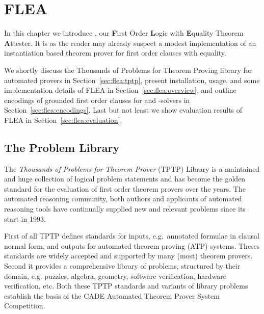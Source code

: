 
\chapter{FLEA}\label{chapter:flea}



In this chapter we introduce \FLEA{},
our
\textbf{F}irst Order \textbf{L}ogic with \textbf{E}quality Theorem \textbf{A}ttester.
It is
as the reader may already suspect
a modest implementation of an instantiation based theorem prover for first order clauses with equality. 

We shortly discuss the Thousands of Problems for Theorem Proving library for automated provers 
in Section~\vref{sec:flea:tptp},
present installation, usage, and some implementation details of FLEA 
in Section~\vref{sec:flea:overview}, 
and outline encodings of grounded first order clauses for \SAT and \SMT-solvers
in Section~\vref{sec:flea:encodings}. 
Last but not least we show evaluation results of FLEA
in Section~\vref{sec:flea:evaluation}.

\section{The Problem Library}\label{sec:flea:tptp}

The \emph{Thousands of Problems for Theorem Prover} (TPTP) Library\cite{Sut17}
is a maintained and huge collection of logical problem statements and
has become the golden standard for the evaluation of first order theorem provers over the years.
The automated reasoning community, both authors and applicants of automated reasoning tools 
have continually supplied new and relevant problems since its start in 1993.

First of all TPTP defines standards for inputs, 
e.g.~annotated formulae in clausal normal form,
and outputs for automated theorem proving (ATP) systems. 
Theses standards are widely accepted and supported by many (most) theorem provers. 
Second it provides a comprehensive library of problems, structured by their domain,
e.g. puzzles, algebra, geometry, software verification, hardware verification, etc.
Both these TPTP standards and variants of library problems establish the basis of the CADE Automated Theorem Prover System Competition\cite{Sut16}.

\newpage
